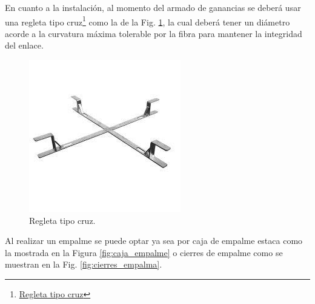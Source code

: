 \documentclass[11pt,a4paper]{article}
\begin{document}
En cuanto a la instalación, al momento del armado de ganancias se deberá usar una regleta tipo cruz\footnote{\href{https://articulo.mercadolibre.com.ar/MLA-909799496-cruz-de-reserva-100-x-100cm-galvanizada-para-fibra-optica-_JM?matt_tool=88481412&matt_word=&matt_source=google&matt_campaign_id=11618987428&matt_ad_group_id=113657532672&matt_match_type=&matt_network=g&matt_device=c&matt_creative=479785004862&matt_keyword=&matt_ad_position=&matt_ad_type=pla&matt_merchant_id=308510455&matt_product_id=MLA909799496&matt_product_partition_id=841218013617&matt_target_id=pla-841218013617&gclid=CjwKCAjw_JuGBhBkEiwA1xmbRUsQ-48g75U_LS2OkDkasr5E-iXwDYYjTvlZx3yOGCESphlHs3DjdhoC0lEQAvD_BwE }{Regleta tipo cruz}} como la de la Fig. \ref{fig:regleta_ruz}, la cual deberá tener un diámetro acorde a la curvatura máxima tolerable por la fibra para mantener la integridad del enlace.

\begin{figure}[htbp]
  \centering
  \includegraphics[width=0.4\linewidth]{fotos_ema/regleta_ruz.jpg}
  \caption{Regleta tipo cruz.}
  \label{fig:regleta_ruz}
\end{figure}


Al realizar un empalme se puede optar ya sea por caja de empalme estaca como la mostrada en la Figura \ref{fig:caja_empalme} o cierres de empalme como se muestran en la Fig. \ref{fig:cierres_empalma}.
\end{document}

